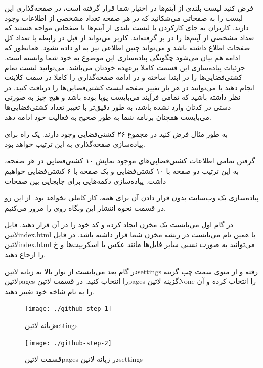 \documentclass[../main.tex]{subfiles}
\begin{document}
فرض کنید لیست بلندی از آیتم‌ها در اختیار شما قرار گرفته است، در صفحه‌گذاری این لیست را به صفحاتی می‌شکانید که در هر صفحه تعداد مشخصی از اطلاعات وجود دارند. کاربران به جای کارکردن با لیست بلندی از آیتم‌ها با صفحاتی مواجه هستند که تعداد مشخصی از آیتم‌ها را در بر گرفته‌اند. کاربر می‌تواند از قبل در رابطه با تعداد کل صفحات اطلاع داشته باشد و می‌تواند چنین اطلاعی نیز به او داده نشود. همانطور که ادامه هم بیان می‌شود چگونگی پیاده‌سازی این موضوع به خود شما وابسته است.
جزئیات پیاده‌سازی این قسمت کاملا برعهده خودتان می‌باشد.
می‌توانید لیست تمام کشتی‌فضایی‌ها را در ابتدا ساخته و در ادامه صفحه‌گذاری را کاملا در سمت کلاینت انجام دهید یا می‌توانید در هر بار تغییر صفحه لیست کشتی‌فضایی‌ها را دریافت کنید.
در نظر داشته باشید که تمامی فرآیند می‌بایست پویا بوده باشد و هیچ چیز به صورتی دستی در کدتان وارد نشده باشد، به طور دقیق‌تر با تغییر تعداد کشتی‌فضایی‌ها می‌بایست همچنان برنامه شما به طور صحیح به فعالیت خود ادامه دهد.

به طور مثال فرض کنید در مجموع ۲۶ کشتی‌فضایی وجود دارند. یک راه برای پیاده‌سازی صفحه‌گذاری به این ترتیب خواهد بود.

 گرفتن تمامی اطلاعات کشتی‌فضایی‌های موجود
 نمایش ۱۰ کشتی‌فضایی در هر صفحه، به این ترتیب دو صفحه با ۱۰ کشتی‌فضایی و یک صفحه با ۶ کشتی‌فضایی خواهیم داشت.
 پیاده‌سازی دکمه‌هایی برای جابجایی بین صفحات

پیاده‌سازی یک وب‌سایت بدون قرار دادن آن برای همه، کار کاملی نخواهد بود. از این رو در قسمت نحوه انتشار این وبگاه روی  را مرور می‌کنیم.

در گام اول می‌بایست یک مخزن ایجاد کرده و کد خود را در آن قرار دهید. فایل ‌لاتین{index.html} با همین نام می‌بایست در ریشه مخزن شما قرار داشته باشد.
در فایل ‌لاتین{index.html} می‌توانید به صورت نسبی سایر فایل‌ها مانند عکس یا اسکریپت‌ها و ‌خ را ارجاع دهید.

در گام بعد می‌بایست از نوار بالا به زبانه ‌لاتین{settings} رفته و از منوی سمت چپ گزینه ‌لاتین{pages} را انتخاب کنید.
در قسمت ‌لاتین{pages} گزینه ‌لاتین{None} را انتخاب کرده و آن را به نام شاخه خود تغییر دهید.

\begin{figure}[h]
  \centering
  \texttt{[image: ./github-step-1]}
  \caption{زبانه ‌لاتین{settings}}
\end{figure}

\begin{figure}[h]
  \centering
  \texttt{[image: ./github-step-2]}
  \caption{قسمت ‌لاتین{pages} در زبانه ‌لاتین{settings}}
\end{figure}
\end{document}
